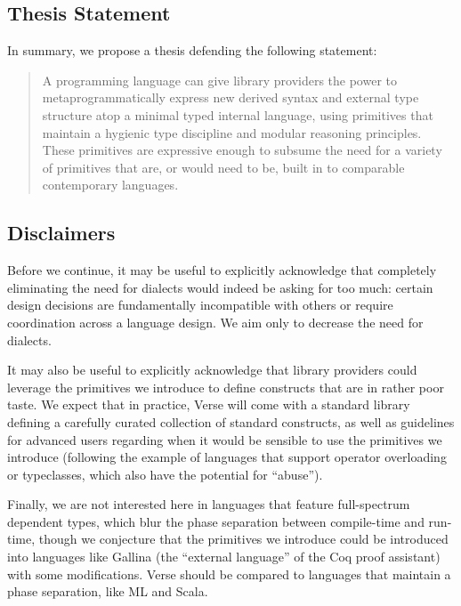 \subsection{Thesis Statement}
In summary, we propose a thesis defending the following statement:
\begin{quote}
A programming language can  give library providers the power to meta\-pro\-gram\-matic\-ally express new derived syntax and external type structure atop a minimal typed internal language, using  primitives that maintain a hygienic type discipline and modular reasoning principles. These  primitives are  expressive enough to subsume the need for a variety of primitives that are, or would need to be, built in to comparable contemporary languages.
\end{quote}

\subsection{Disclaimers}
Before we continue, it may be useful to explicitly acknowledge that completely eliminating the need for dialects would indeed be asking for too much: certain design decisions are fundamentally incompatible with others or require coordination across a language design. We aim only to decrease the need for dialects.%

It may also be useful to explicitly acknowledge that library providers could leverage the primitives we introduce   to define constructs that are in rather poor taste. We  expect that in practice, Verse will come with a standard library defining a carefully curated collection of standard constructs, as well as guidelines for advanced users regarding when it would be sensible to use the primitives we introduce (following the example of languages that support operator overloading or typeclasses, which also have the potential for ``abuse''). %

Finally, we are not interested here in languages that feature full-spectrum dependent types, which blur the phase separation between compile-time and run-time, though we conjecture that the primitives we introduce could be introduced into languages like Gallina (the ``external language'' of the Coq proof assistant) with some modifications. Verse should be compared to languages that maintain a phase separation, like ML and Scala. %




